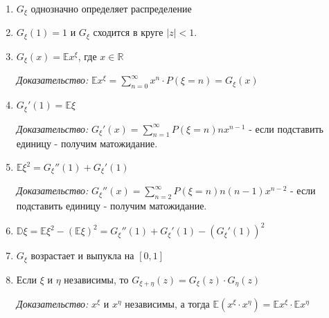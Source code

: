 \begin{properties}
    \begin{enumerate}
        \item {
            $G_{\xi}$ однозначно определяет распределение
        }
        \item {
            $G_{\xi}(1) = 1$ и $G_{\xi}$ сходится в круге $|z| < 1$.
        }
        \item {
            $G_{\xi} (x) = \mathbb{E} x^{\xi}$, где $x \in \mathbb{R}$

            \textit{Доказательство: } $\mathbb{E} x^{\xi} = \sum_{n=0}^{\infty} x^{n} \cdot P(\xi = n) = G_{\xi} (x)$
        }
        \item {
            $G_{\xi}'(1) = \mathbb{E} \xi$

            \textit{Доказательство: } $G_{\xi}'(x) = \sum_{n = 1}^{\infty} P(\xi = n) nx^{n-1}$ - если подставить единицу - получим матожидание.
        }
        \item {
            $\mathbb{E}\xi^2 = G_{\xi}''(1) + G_{\xi}'(1)$

            \textit{Доказательство: } $G_{\xi}''(x) = \sum_{n = 2}^{\infty} P(\xi = n) n(n-1)x^{n-2}$ - если подставить единицу - получим матожидание.
        }
        \item {
            $\mathbb{D} \xi = \mathbb{E}\xi^2 - (\mathbb{E}\xi)^2  = G_{\xi}''(1) + G_{\xi}'(1) - (G_{\xi}'(1))^2$
        }
        \item {
            $G_{\xi}$ возрастает и выпукла на $[0, 1]$
        }
        \item {
            Если $\xi$ и $\eta$ независимы, то $G_{\xi + \eta}(z) = G_{\xi}(z) \cdot G_{\eta}(z)$

            \textit{Доказательство: } $x^\xi$ и $x^\eta$ независимы, а тогда $\mathbb{E} (x^\xi \cdot x^\eta) = \mathbb{E} x^{\xi} \cdot \mathbb{E} x^{\eta}$
        }
    \end{enumerate}
\end{properties}

